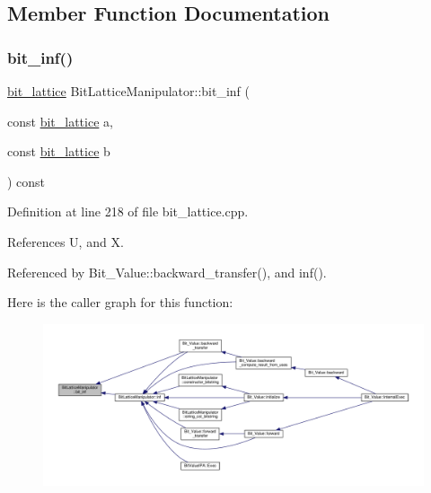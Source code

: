 \subsection{Member Function Documentation}
\mbox{\label{classBitLatticeManipulator_a75559217d7d2d6f397b3252e8234898b}} 
\subsubsection{\texorpdfstring{bit\+\_\+inf()}{bit\_inf()}}
{\footnotesize\ttfamily \hyperlink{bit__lattice_8hpp_ab732360111c810c4eaeb4c8b81d160d6}{bit\+\_\+lattice} Bit\+Lattice\+Manipulator\+::bit\+\_\+inf (\begin{DoxyParamCaption}\item[{const \hyperlink{bit__lattice_8hpp_ab732360111c810c4eaeb4c8b81d160d6}{bit\+\_\+lattice}}]{a,  }\item[{const \hyperlink{bit__lattice_8hpp_ab732360111c810c4eaeb4c8b81d160d6}{bit\+\_\+lattice}}]{b }\end{DoxyParamCaption}) const\hspace{0.3cm}{\ttfamily [protected]}}



Definition at line 218 of file bit\+\_\+lattice.\+cpp.



References U, and X.



Referenced by Bit\+\_\+\+Value\+::backward\+\_\+transfer(), and inf().

Here is the caller graph for this function\+:
\nopagebreak
\begin{figure}[H]
\begin{center}
\leavevmode
\includegraphics[width=350pt]{dd/d98/classBitLatticeManipulator_a75559217d7d2d6f397b3252e8234898b_icgraph}
\end{center}
\end{figure}
\mbox{\label{classBitLatticeManipulator_adeb8cad98cb703dfa33e6d0170edf096}} 
